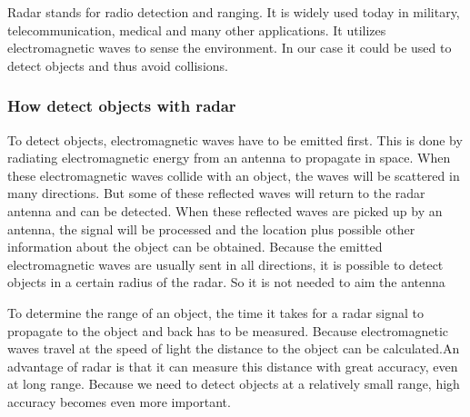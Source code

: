 \documentclass{article}
\begin{document}
Radar stands for radio detection and ranging. It is widely used today in military, telecommunication, medical and many other applications. It utilizes electromagnetic waves to sense the environment. In our case it could be used to detect objects and thus avoid collisions.

\subsubsection{How detect objects with radar}

To detect objects, electromagnetic waves have to be emitted first. This is done by radiating electromagnetic energy from an antenna to propagate in space. When these electromagnetic waves collide with an object, the waves will be scattered in many directions. But some of these reflected waves will return to the radar antenna and can be detected. When these reflected waves are picked up by an antenna, the signal will be processed and the location plus possible other information about the object can be obtained. Because the emitted electromagnetic waves are usually sent in all directions, it is possible to detect objects in a certain radius of the radar. So it is not needed to aim the antenna

To determine the range of an object, the time it takes for a radar signal to propagate to the object and back has to be measured. Because electromagnetic waves travel at the speed of light the distance to the object can be calculated.An advantage of radar is that it can measure this distance with great accuracy, even at long range. Because we need to detect objects at a relatively small range, high accuracy becomes even more important.
\end{document}
